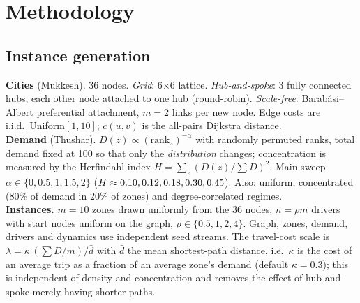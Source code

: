 \documentclass[11pt]{article}
\begin{document}
\section{Methodology}\label{sec:method}
\subsection{Instance generation}
\textbf{Cities} (Mukkesh). 36 nodes. \emph{Grid}: 6$\times$6 lattice. \emph{Hub-and-spoke}: 3 fully connected hubs, each other node attached to one hub (round-robin). \emph{Scale-free}: Barab\'asi--Albert preferential attachment, $m=2$ links per new node. Edge costs are i.i.d.\ Uniform$[1,10]$; $c(u,v)$ is the all-pairs Dijkstra distance.\\
\textbf{Demand} (Thushar). $D(z)\propto(\mathrm{rank}_z)^{-\alpha}$ with randomly permuted ranks, total demand fixed at 100 so that only the \emph{distribution} changes; concentration is measured by the Herfindahl index $H=\sum_z(D(z)/\sum D)^2$. Main sweep $\alpha\in\{0,0.5,1,1.5,2\}$ ($H\approx0.10,0.12,0.18,0.30,0.45$). Also: uniform, concentrated (80\% of demand in 20\% of zones) and degree-correlated regimes.\\
\textbf{Instances.} $m=10$ zones drawn uniformly from the 36 nodes, $n=\rho m$ drivers with start nodes uniform on the graph, $\rho\in\{0.5,1,2,4\}$. Graph, zones, demand, drivers and dynamics use independent seed streams. The travel-cost scale is $\lambda=\kappa\,(\sum D/m)/\bar d$ with $\bar d$ the mean shortest-path distance, i.e.\ $\kappa$ is the cost of an average trip as a fraction of an average zone's demand (default $\kappa=0.3$); this is independent of density and concentration and removes the effect of hub-and-spoke merely having shorter paths.
\end{document}
